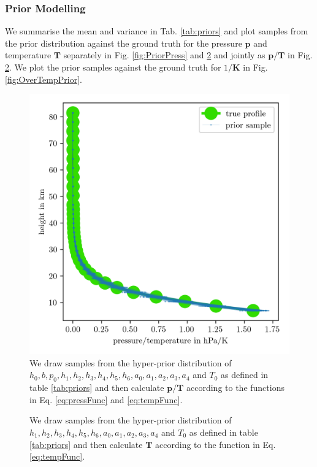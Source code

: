 \subsubsection{Prior Modelling}
We summarise the mean and variance in Tab. \ref{tab:priors} and plot samples from the prior distribution against the ground truth for the pressure $\bm{p}$ and temperature $\bm{T}$ separately in Fig. \ref{fig:PriorPress} and \ref{fig:PriorTemp} and jointly as $\bm{p}/\bm{T}$ in Fig. \ref{fig:PriorTemp}.
We plot the prior samples against the ground truth for $1/\bm{K}$ in Fig. \ref{fig:OverTempPrior}.
\begin{figure}[ht!]
	\centering
	\includegraphics{PriorTempOverPostMeanSigm.png}
	\caption[Prior Samples of $\bm{p}/\bm{T}$ according to the respective hyper-prior distribution.]{We draw samples from the hyper-prior distribution of $h_0, b, p_0, h_1, h_2,h_3,h_4,h_5,h_6, a_0, a_1, a_2,a_3,a_4$ and $T_0$ as defined in table \ref{tab:priors} and then calculate $\bm{p}/\bm{T}$ according to the functions in Eq. \ref{eq:pressFunc} and \ref{eq:tempFunc}.}
	\label{fig:PriorPressOverTemp}
\end{figure}

\begin{figure}[ht!]
	\centering
	
	\caption[Prior Samples of $\bm{T}$ according to the respective hyper-prior distribution.]{We draw samples from the hyper-prior distribution of $h_1, h_2,h_3,h_4,h_5,h_6, a_0, a_1, a_2,a_3,a_4$ and $T_0$ as defined in table \ref{tab:priors} and then calculate $\bm{T}$ according to the function in Eq. \ref{eq:tempFunc}.}
	\label{fig:PriorTemp}
\end{figure}

